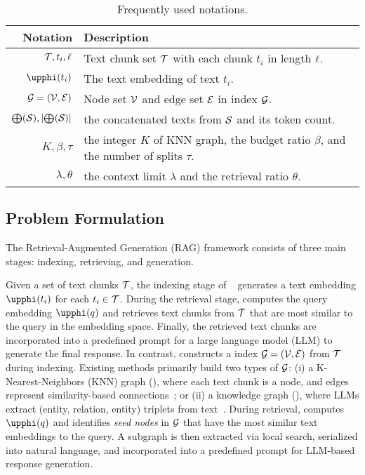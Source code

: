 \begin{table}[!t]
\centering
\renewcommand{\arraystretch}{1.1}
\begin{small}
\caption{Frequently used notations.}\vspace{-2.4mm} \label{tab:notation}
\begin{tabular}{rp{2.2in}}	
    \toprule
    \bf Notation & \bf Description \\
    \midrule
    $\mathcal{T}, t_i, \ell$ & Text chunk set $\mathcal{T}$ with each chunk $t_i$ in length $\ell$. \\
    $\temb{t_{i}}$ & The text embedding of text $t_i$.\\
    $\mathcal{G} = (\mathcal{V}, \mathcal{E})$   &  Node set $\mathcal{V}$ and edge set $\mathcal{E}$ in \textgraph{} index $\mathcal{G}$. \\
    $\bigoplus(\mathcal{S}), \left|\bigoplus(\mathcal{S})\right|$   &  the concatenated texts from $\mathcal{S}$ and its token count. \\
    $K, \beta, \tau$   &  the integer $K$ of KNN graph, the budget ratio $\beta$, and the number of splits $\tau$. \\
    $\lambda, \theta$   &  the context limit $\lambda$ and the retrieval ratio $\theta$. \\
    \bottomrule
\end{tabular}
\end{small}
\end{table}

\subsection{Problem Formulation}\label{sec:rag}
The Retrieval-Augmented Generation (RAG) framework consists of three main stages: indexing, retrieving, and generation. 

Given a set of text chunks $\mathcal{T}$, the indexing stage of \textrag~\cite{lewis2020retrieval} generates a text embedding $\temb{t_i}$ for each $t_i \in \mathcal{T}$. During the retrieval stage, \textrag computes the query embedding $\temb{q}$ and retrieves text chunks from $\mathcal{T}$ that are most similar to the query in the embedding space. Finally, the retrieved text chunks are incorporated into a predefined prompt for a large language model (LLM) to generate the final response.
In contrast, \graphrag constructs a \textgraph{} index $\mathcal{G} = (\mathcal{V}, \mathcal{E})$ from $\mathcal{T}$ during indexing. Existing methods primarily build two types of $\mathcal{G}$: (i) a K-Nearest-Neighbors (KNN) graph (\knnrag), where each text chunk is a node, and edges represent similarity-based connections~\cite{li2024graph,wang2024knowledge}; or (ii) a knowledge graph (\kgrag), where LLMs extract (entity, relation, entity) triplets from text~\cite{li2024dalk,delile2024graph,edge2024local,gutierrez2024hipporag}.
During retrieval, \graphrag computes $\temb{q}$ and identifies \textit{seed nodes} in $\mathcal{G}$ that have the most similar text embeddings to the query. A subgraph is then extracted via local search, serialized into natural language, and incorporated into a predefined prompt for LLM-based response generation.


